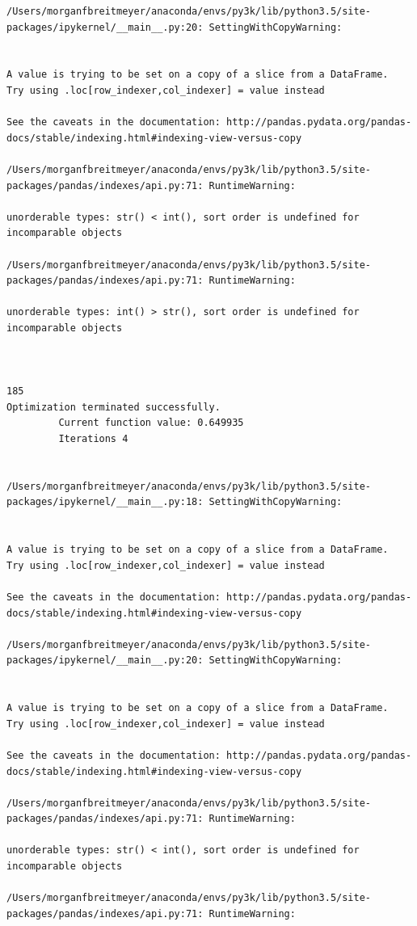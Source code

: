 \begin{lstlisting}
/Users/morganfbreitmeyer/anaconda/envs/py3k/lib/python3.5/site-packages/ipykernel/__main__.py:20: SettingWithCopyWarning:


A value is trying to be set on a copy of a slice from a DataFrame.
Try using .loc[row_indexer,col_indexer] = value instead

See the caveats in the documentation: http://pandas.pydata.org/pandas-docs/stable/indexing.html#indexing-view-versus-copy

/Users/morganfbreitmeyer/anaconda/envs/py3k/lib/python3.5/site-packages/pandas/indexes/api.py:71: RuntimeWarning:

unorderable types: str() < int(), sort order is undefined for incomparable objects

/Users/morganfbreitmeyer/anaconda/envs/py3k/lib/python3.5/site-packages/pandas/indexes/api.py:71: RuntimeWarning:

unorderable types: int() > str(), sort order is undefined for incomparable objects



185
Optimization terminated successfully.
         Current function value: 0.649935
         Iterations 4


/Users/morganfbreitmeyer/anaconda/envs/py3k/lib/python3.5/site-packages/ipykernel/__main__.py:18: SettingWithCopyWarning:


A value is trying to be set on a copy of a slice from a DataFrame.
Try using .loc[row_indexer,col_indexer] = value instead

See the caveats in the documentation: http://pandas.pydata.org/pandas-docs/stable/indexing.html#indexing-view-versus-copy

/Users/morganfbreitmeyer/anaconda/envs/py3k/lib/python3.5/site-packages/ipykernel/__main__.py:20: SettingWithCopyWarning:


A value is trying to be set on a copy of a slice from a DataFrame.
Try using .loc[row_indexer,col_indexer] = value instead

See the caveats in the documentation: http://pandas.pydata.org/pandas-docs/stable/indexing.html#indexing-view-versus-copy

/Users/morganfbreitmeyer/anaconda/envs/py3k/lib/python3.5/site-packages/pandas/indexes/api.py:71: RuntimeWarning:

unorderable types: str() < int(), sort order is undefined for incomparable objects

/Users/morganfbreitmeyer/anaconda/envs/py3k/lib/python3.5/site-packages/pandas/indexes/api.py:71: RuntimeWarning:


\end{lstlisting}
